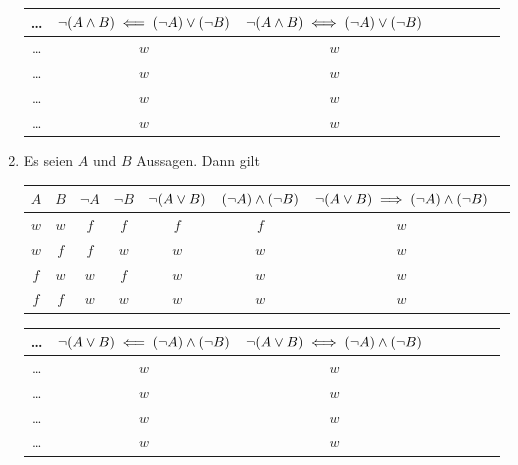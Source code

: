 \documentclass[german,12pt]{homework}
\DeclarePairedDelimiter{\enbrace}{(}{)}
\begin{document}
\begin{enumerate}
\begin{center}
            \begin{tabular}{cccccccc}
                \toprule
                \ldots & \(\lnot\enbrace*{A \land B} \impliedby
                \enbrace*{\lnot{A}} \lor \enbrace*{\lnot{B}}\) &
                \(\lnot\enbrace*{A \land B} \iff \enbrace*{\lnot{A}} \lor
                \enbrace*{\lnot{B}}\)\\
                \midrule
                \ldots & \(w\) & \(w\)\\
                \ldots & \(w\) & \(w\)\\
                \ldots & \(w\) & \(w\)\\
                \ldots & \(w\) & \(w\)\\
                \bottomrule
            \end{tabular}
        \end{center}
        \item Es seien \(A\) und \(B\) Aussagen. Dann gilt
        \begin{center}
            \begin{tabular}{cccccccc}
                \toprule
                \(A\) & \(B\) & \(\lnot{A}\) & \(\lnot{B}\) &
                \(\lnot\enbrace*{A \lor B}\) & \(\enbrace*{\lnot{A}} \land
                \enbrace*{\lnot{B}}\) & \(\lnot\enbrace*{A \lor B} \implies
                \enbrace*{\lnot{A}} \land \enbrace*{\lnot{B}}\)\\
                \midrule
                \(w\) & \(w\) & \(f\) & \(f\) & \(f\) & \(f\) & \(w\)\\
                \(w\) & \(f\) & \(f\) & \(w\) & \(w\) & \(w\) & \(w\)\\
                \(f\) & \(w\) & \(w\) & \(f\) & \(w\) & \(w\) & \(w\)\\
                \(f\) & \(f\) & \(w\) & \(w\) & \(w\) & \(w\) & \(w\)\\
                \bottomrule
            \end{tabular}

            \vspace{.2in}

            \begin{tabular}{cccccccc}
                \toprule
                \ldots & \(\lnot\enbrace*{A \lor B} \impliedby
                \enbrace*{\lnot{A}} \land \enbrace*{\lnot{B}}\) &
                \(\lnot\enbrace*{A \lor B} \iff \enbrace*{\lnot{A}} \land
                \enbrace*{\lnot{B}}\)\\
                \midrule
                \ldots & \(w\) & \(w\)\\
                \ldots & \(w\) & \(w\)\\
                \ldots & \(w\) & \(w\)\\
                \ldots & \(w\) & \(w\)\\
                \bottomrule
            \end{tabular}
        \end{center}
    \end{enumerate}
\end{document}
